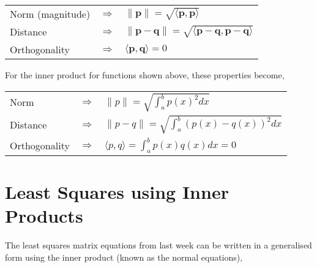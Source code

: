 \documentclass[12pt]{article}
\begin{document}
{\renewcommand{\arraystretch}{1.5}

\begin{tabular}{p{40mm}p{15mm}p{50mm}}
Norm (magnitude) & $\Rightarrow$	& $\|\mathbf{p}\| = \sqrt{\langle \mathbf{p},\mathbf{p} \rangle}$ \\[1em]
Distance & $\Rightarrow$			& $\|\mathbf{p}-\mathbf{q}\| = \sqrt{\langle \mathbf{p}-\mathbf{q},\mathbf{p}-\mathbf{q} \rangle}$ \\[1em]
Orthogonality & $\Rightarrow$	& $\langle \mathbf{p},\mathbf{q} \rangle = 0$ \\[1em]
\end{tabular}

\vspace{4mm}

For the inner product for functions shown above, these properties become,

\vspace{6mm}

\begin{tabular}{p{40mm}p{15mm}p{70mm}}
Norm & $\Rightarrow$			& $\|p\| = \sqrt{\int_a^b p(x)^2 dx}$ \\[1em]
Distance & $\Rightarrow$		& $\|p-q\| = \sqrt{\int_a^b \left( p(x) - q(x) \right)^2 dx}$ \\[1em]
Orthogonality & $\Rightarrow$	& $\langle p,q \rangle = \int_a^b p(x)q(x) dx = 0$ \\[1em]
\end{tabular}

\newpage

\section{Least Squares using Inner Products}

\vspace{4mm}

The least squares matrix equations from last week can be written in a generalised form using the inner product (known as the normal equations),

\vspace{4mm}

}
\end{document}
